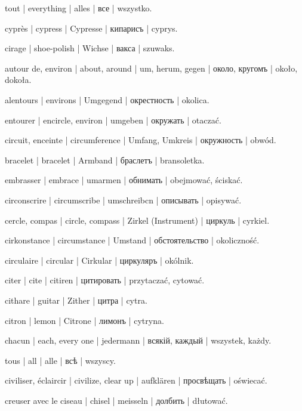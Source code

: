 \begin{outdent}{1em}
tout | everything | alles | все | wszystko.

cyprès | cypress | Cypresse | кипарисъ | cyprys.

cirage | shoe-polish | Wichse | вакса | szuwaks.

autour de, environ | about, around | um, herum, gegen | около, кругомъ | około, dokoła.

\uvsubentry{}
alentours | environs | Umgegend | окрестность | okolica.


\uvsubentry{}
entourer | encircle, environ | umgeben | окружать | otaczać.


\uvsubentry{}
circuit, enceinte | circumference | Umfang, Umkreis | окружность | obwód.


\uvsubentry{}
bracelet | bracelet | Armband | браслетъ | bransoletka.


\uvsubentry{}
embrasser | embrace | umarmen | обнимать | obejmować, ściskać.


\uvsubentry{}
circonscrire | circumscribe | umschreibcn | описывать | opisywać.

cercle, compas | circle, compass | Zirkel (Instrument) | циркуль | cyrkiel.

cirkonstance | circumstance | Umstand | обстоятельство | okoliczność.

circulaire | circular | Cirkular | циркуляръ | okólnik.

citer | cite | citiren | цитировать | przytaczać, cytować.

cithare | guitar | Zither | цитра | cytra.

citron | lemon | Citrone | лимонъ | cytryna.

chacun | each, every one | jedermann | всякій, каждый | wszystek, każdy.

\uvsubentry{}
tous | all | alle | всѣ | wszyscy.

civiliser, éclaircir | civilize, clear up | aufklären | просвѣщать | oświecać.

creuser avec le ciseau | chisel | meisseln | долбить | dłutować.


\end{outdent}
